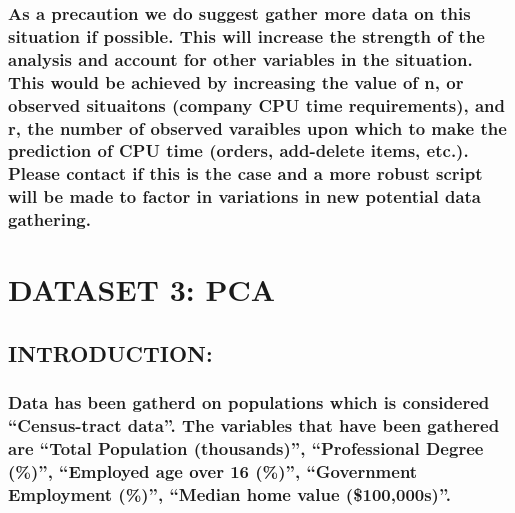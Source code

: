\documentclass[]{article}
\begin{document}
\hypertarget{as-a-precaution-we-do-suggest-gather-more-data-on-this-situation-if-possible.-this-will-increase-the-strength-of-the-analysis-and-account-for-other-variables-in-the-situation.-this-would-be-achieved-by-increasing-the-value-of-n-or-observed-situaitons-company-cpu-time-requirements-and-r-the-number-of-observed-varaibles-upon-which-to-make-the-prediction-of-cpu-time-orders-add-delete-items-etc..-please-contact-if-this-is-the-case-and-a-more-robust-script-will-be-made-to-factor-in-variations-in-new-potential-data-gathering.}{%
\subsubsection{As a precaution we do suggest gather more data on this
situation if possible. This will increase the strength of the analysis
and account for other variables in the situation. This would be achieved
by increasing the value of n, or observed situaitons (company CPU time
requirements), and r, the number of observed varaibles upon which to
make the prediction of CPU time (orders, add-delete items, etc.). Please
contact if this is the case and a more robust script will be made to
factor in variations in new potential data
gathering.}\label{as-a-precaution-we-do-suggest-gather-more-data-on-this-situation-if-possible.-this-will-increase-the-strength-of-the-analysis-and-account-for-other-variables-in-the-situation.-this-would-be-achieved-by-increasing-the-value-of-n-or-observed-situaitons-company-cpu-time-requirements-and-r-the-number-of-observed-varaibles-upon-which-to-make-the-prediction-of-cpu-time-orders-add-delete-items-etc..-please-contact-if-this-is-the-case-and-a-more-robust-script-will-be-made-to-factor-in-variations-in-new-potential-data-gathering.}}

\hypertarget{dataset-3-pca}{%
\section{DATASET 3: PCA}\label{dataset-3-pca}}

\hypertarget{introduction-1}{%
\subsection{INTRODUCTION:}\label{introduction-1}}

\hypertarget{data-has-been-gatherd-on-populations-which-is-considered-census-tract-data.-the-variables-that-have-been-gathered-are-total-population-thousands-professional-degree-employed-age-over-16-government-employment-median-home-value-100000s.}{%
\subsubsection{Data has been gatherd on populations which is considered
``Census-tract data''. The variables that have been gathered are ``Total
Population (thousands)'', ``Professional Degree (\%)'', ``Employed age
over 16 (\%)'', ``Government Employment (\%)'', ``Median home value
(\$100,000s)''.}\label{data-has-been-gatherd-on-populations-which-is-considered-census-tract-data.-the-variables-that-have-been-gathered-are-total-population-thousands-professional-degree-employed-age-over-16-government-employment-median-home-value-100000s.}}
\end{document}
